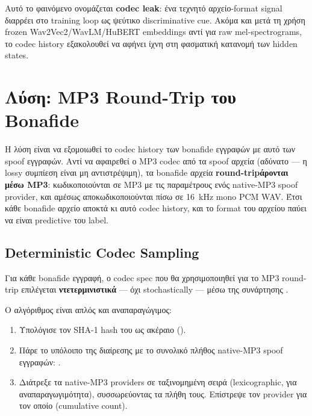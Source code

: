 Αυτό το φαινόμενο ονομάζεται \textbf{codec leak}:
ένα τεχνητό αρχείο-format signal διαρρέει στο training loop
ως ψεύτικο discriminative cue.
Ακόμα και μετά τη χρήση frozen Wav2Vec2/WavLM/HuBERT embeddings
αντί για raw mel-spectrograms, το codec history εξακολουθεί
να αφήνει ίχνη στη φασματική κατανομή των hidden states.

\section{Λύση: MP3 Round-Trip του Bonafide}
\label{sec:mp3-roundtrip}

Η λύση είναι να εξομοιωθεί το codec history των bonafide εγγραφών
με αυτό των spoof εγγραφών.
Αντί να αφαιρεθεί ο MP3 codec από τα spoof αρχεία
(αδύνατο — η lossy συμπίεση είναι μη αντιστρέψιμη),
τα bonafide αρχεία \textbf{round-tripάρονται μέσω MP3}:
κωδικοποιούνται σε MP3 με τις παραμέτρους ενός native-MP3 spoof provider,
και αμέσως αποκωδικοποιούνται πίσω σε 16~kHz mono PCM WAV.
Έτσι κάθε bonafide αρχείο αποκτά κι αυτό codec history,
και το format του αρχείου παύει να είναι predictive του label.

\subsection{Deterministic Codec Sampling}
\label{subsec:deterministic-codec-sampling}

Για κάθε bonafide εγγραφή, ο codec spec που θα χρησιμοποιηθεί
για το MP3 round-trip επιλέγεται \textbf{ντετερμινιστικά} —
όχι stochastically — μέσω της συνάρτησης
.

Ο αλγόριθμος είναι απλός και αναπαραγώγιμος:

\begin{english}
\begin{enumerate}
  \item Υπολόγισε τον SHA-1 hash του  ως ακέραιο
        ().
  \item Πάρε το υπόλοιπο της διαίρεσης με το συνολικό πλήθος
        native-MP3 spoof εγγραφών:
        .
  \item Διάτρεξε τα native-MP3 providers σε ταξινομημένη σειρά
        (lexicographic, για αναπαραγωγιμότητα),
        συσσωρεύοντας τα πλήθη τους.
        Επίστρεψε τον provider για τον οποίο
         (cumulative count).
\end{enumerate}
\end{english}

